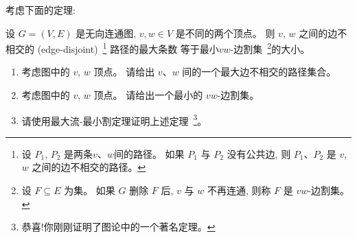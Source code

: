 \documentclass[a4paper, justified]{tufte-handout}
\begin{document}
\begin{problem}[\score{5 = 1 + 1 + 3} $\star\star\star\star$]
  考虑下面的定理:
  \begin{theorem}[不能告诉你名字的某个著名定理]
    设 $G = (V, E)$ 是无向连通图, $v, w \in V$ 是不同的两个顶点。
    则 $v$, $w$ 之间的边不相交的 (edge-disjoint)~\footnote{
      设 $P_{1}$, $P_{2}$ 是两条$v$、$w$间的路径。
      如果 $P_{1}$ 与 $P_{2}$ 没有公共边,
      则 $P_{1}$、$P_{2}$ 是 $v$, $w$ 之间的边不相交的路径。
    } 路径的最大条数
    等于最小$vw$-边割集~\footnote{
      设 $F \subseteq E$ 为集。
      如果 $G$ 删除 $F$ 后, $v$ 与 $w$ 不再连通,
      则称 $F$ 是 $vw$-边割集。
    }的大小。
  \end{theorem}


  \begin{enumerate}[(1)]
    \item 考虑图中的 $v$, $w$ 顶点。
      请给出 $v$、$w$ 间的一个最大边不相交的路径集合。
    \item 考虑图中的 $v$, $w$ 顶点。
      请给出一个最小的 $vw$-边割集。
    \item 请使用最大流-最小割定理证明上述定理~\footnote{恭喜!你刚刚证明了图论中的一个著名定理。}。
  \end{enumerate}
\end{problem}
\end{document}

